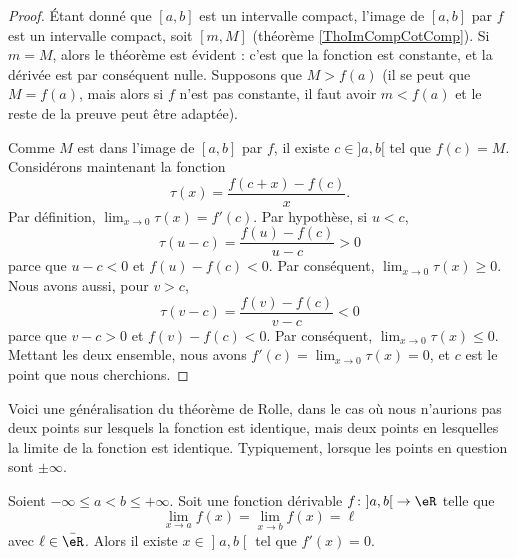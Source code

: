 \begin{proof}
    Étant donné que $[a,b]$ est un intervalle compact, l'image de $[a,b]$ par $f$ est un intervalle compact, soit $[m,M]$ (théorème \ref{ThoImCompCotComp}). Si $m=M$, alors le théorème est évident : c'est que la fonction est constante, et la dérivée est par conséquent nulle. Supposons que $M> f(a)$ (il se peut que $M=f(a)$, mais alors si $f$ n'est pas constante, il faut avoir $m<f(a)$ et le reste de la preuve peut être adaptée).

    Comme $M$ est dans l'image de $[a,b]$ par $f$, il existe $c\in ]a,b[$ tel que $f(c)=M$. Considérons maintenant la fonction
    \begin{equation}
        \tau(x) =\frac{ f(c+x)-f(c) }{ x }.
    \end{equation}
    Par définition, $\lim_{x\to 0}\tau(x)=f'(c)$. Par hypothèse, si $u<c$,
    \begin{equation}
        \tau(u-c) = \frac{ f(u)-f(c) }{ u-c }>0
    \end{equation}
    parce que $u-c<0$ et $f(u)-f(c)<0$. Par conséquent, $\lim_{x\to 0}\tau(x)\geq 0$. Nous avons aussi, pour $v>c$,
    \begin{equation}
        \tau(v-c) = \frac{ f(v)-f(c) }{ v-c }<0
    \end{equation}
    parce que $v-c>0$ et $f(v)-f(c)<0$. Par conséquent, $\lim_{x\to 0}\tau(x)\leq 0$. Mettant les deux ensemble, nous avons $f'(c)=\lim_{x\to 0}\tau(x)=0$, et $c$ est le point que nous cherchions.
\end{proof}

Voici une généralisation du théorème de Rolle, dans le cas où nous n'aurions pas deux points sur lesquels la fonction est identique, mais deux points en lesquelles la limite de la fonction est identique. Typiquement, lorsque les points en question sont \( \pm\infty\).
\begin{theorem}           \label{THOooXDTBooFeSZoK}
    Soient \( -\infty\leq a<b\leq +\infty\). Soit une fonction dérivable \( f\colon \mathopen] a , b \mathclose[\to \eR\) telle que
    \begin{equation}
        \lim_{x\to a} f(x)=\lim_{x\to b} f(x)=\ell    
    \end{equation}
avec \( \ell\in \bar \eR\). Alors il existe \( x\in \mathopen] a , b \mathclose[\) tel que \( f'(x)=0\).
\end{theorem}

